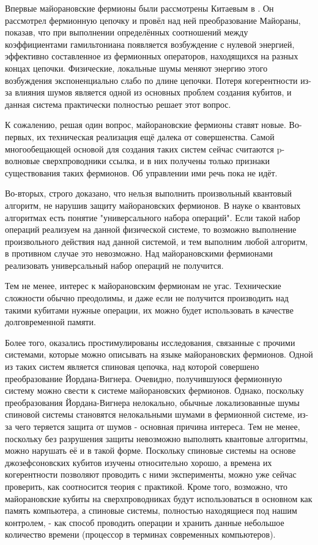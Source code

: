 \documentclass[a4paper,12pt]{article}
\theoremstyle{plain} %
\theoremstyle{definition} %
\theoremstyle{remark} %
\begin{document}
Впервые майорановские фермионы были рассмотрены Китаевым в \cite{kitaev}. Он рассмотрел фермионную цепочку и провёл над ней преобразование Майораны, показав, что при выполнении определённых соотношений между коэффициентами гамильтониана появляется возбуждение с нулевой энергией, эффективно составленное из фермионных операторов, находящихся на разных концах цепочки. Физические, локальные шумы меняют энергию этого возбуждения экспоненциально слабо по длине цепочки. Потеря когерентности из-за влияния шумов является одной из основных проблем создания кубитов, и данная система практически полностью решает этот вопрос.

К сожалению, решая один вопрос, майорановские фермионы ставят новые. Во-первых, их техническая реализация ещё далека от совершенства. Самой многообещающей основой для создания таких систем сейчас считаются p-волновые сверхпроводники {\color{red}ссылка}, и в них получены только признаки существования таких фермионов. Об управлении ими речь пока не идёт.

Во-вторых, строго доказано, что нельзя выполнить произвольный квантовый алгоритм, не нарушив защиту майорановских фермионов. В науке о квантовых алгоритмах есть понятие "универсального набора операций"$ $. Если такой набор операций реализуем на данной физической системе, то возможно выполнение произвольного действия над данной системой, и тем выполним любой алгоритм, в противном случае это невозможно. Над майорановскими фермионами реализовать универсальный набор операций не получится.

Тем не менее, интерес к майорановским фермионам не угас. Технические сложности обычно преодолимы, и даже если не получится производить над такими кубитами нужные операции, их можно будет использовать в качестве долговременной памяти. 

Более того, оказались простимулированы исследования, связанные с прочими системами, которые можно описывать на языке майорановских фермионов. Одной из таких систем является спиновая цепочка, над которой совершено преобразование Йордана-Вигнера. Очевидно, получившуюся фермионную систему можно свести к системе майорановских фермионов. Однако, поскольку преобразования Йордана-Вигнера нелокально, обычные локализованные шумы спиновой системы становятся нелокальными шумами в фермионной системе, из-за чего теряется защита от шумов - основная причина интереса. Тем не менее, поскольку без разрушения защиты невозможно выполнять квантовые алгоритмы, можно нарушать её и в такой форме. Поскольку спиновые системы на основе джозефсоновских кубитов изучены относительно хорошо, а времена их когерентности позволяют проводить с ними эксперименты, можно уже сейчас проверить, как соотносится теория с практикой. Кроме того, возможно, что майорановские кубиты на сверхпроводниках будут использоваться в основном как память компьютера, а спиновые системы, полностью находящиеся под нашим контролем, - как способ проводить операции и хранить данные небольшое количество времени (процессор в терминах современных компьютеров).
\end{document}
